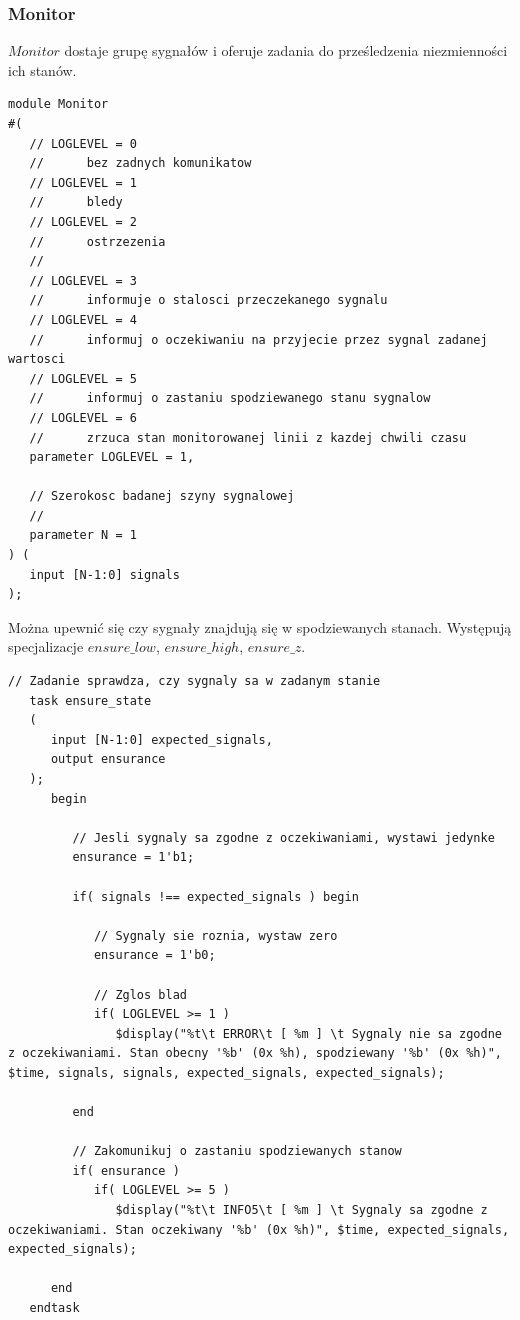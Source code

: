 \documentclass[a4paper,12pt]{article}
\begin{document}
\subsubsection{Monitor}

$Monitor$ dostaje grupę sygnałów i oferuje zadania do prześledzenia niezmienności ich stanów.
\begin{lstlisting}[label=Monitor,caption=Monitor.v,firstnumber=0]
module Monitor
#(
   // LOGLEVEL = 0
   //      bez zadnych komunikatow
   // LOGLEVEL = 1
   //      bledy
   // LOGLEVEL = 2
   //      ostrzezenia
   //
   // LOGLEVEL = 3
   //      informuje o stalosci przeczekanego sygnalu
   // LOGLEVEL = 4
   //      informuj o oczekiwaniu na przyjecie przez sygnal zadanej wartosci
   // LOGLEVEL = 5
   //      informuj o zastaniu spodziewanego stanu sygnalow
   // LOGLEVEL = 6
   //      zrzuca stan monitorowanej linii z kazdej chwili czasu
   parameter LOGLEVEL = 1,

   // Szerokosc badanej szyny sygnalowej
   //
   parameter N = 1
) (
   input [N-1:0] signals
);
\end{lstlisting}

Można upewnić się czy sygnały znajdują się w spodziewanych stanach. Występują specjalizacje $ensure\_low$, $ensure\_high$, $ensure\_z$.
\begin{lstlisting}[label=Monitor,caption=Monitor.v,firstnumber=27]
   // Zadanie sprawdza, czy sygnaly sa w zadanym stanie
   task ensure_state
   (
      input [N-1:0] expected_signals,
      output ensurance
   );
      begin

         // Jesli sygnaly sa zgodne z oczekiwaniami, wystawi jedynke
         ensurance = 1'b1;

         if( signals !== expected_signals ) begin

            // Sygnaly sie roznia, wystaw zero
            ensurance = 1'b0;

            // Zglos blad
            if( LOGLEVEL >= 1 )
               $display("%t\t ERROR\t [ %m ] \t Sygnaly nie sa zgodne z oczekiwaniami. Stan obecny '%b' (0x %h), spodziewany '%b' (0x %h)", $time, signals, signals, expected_signals, expected_signals);

         end

         // Zakomunikuj o zastaniu spodziewanych stanow
         if( ensurance )
            if( LOGLEVEL >= 5 )
               $display("%t\t INFO5\t [ %m ] \t Sygnaly sa zgodne z oczekiwaniami. Stan oczekiwany '%b' (0x %h)", $time, expected_signals, expected_signals);

      end
   endtask
\end{lstlisting}
\end{document}
